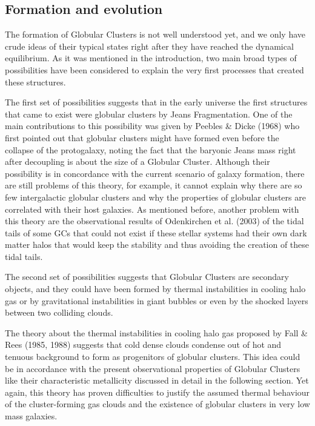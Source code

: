 \subsection{Formation and evolution}

The formation of Globular Clusters is not well understood yet, and we only have crude ideas of their typical states right after they have reached the dynamical equilibrium. As it was mentioned in the introduction, two main broad types of possibilities have been considered to explain the very first processes that created these structures. 

The first set of possibilities suggests that in the early universe the first structures that came to exist were globular clusters by Jeans Fragmentation. One of the main contributions to this possibility was given by Peebles \& Dicke (1968) \cite{7} who first pointed out that globular clusters might have formed even before the collapse of the protogalaxy, noting the fact that the baryonic Jeans mass right after decoupling is about the size of a Globular Cluster. Although their possibility is in concordance with the current scenario of galaxy formation, there are still problems of this theory, for example, it cannot explain why there are so few intergalactic globular clusters and why the properties of globular clusters are correlated with their host galaxies. As mentioned before, another problem with this theory are the observational results of Odenkirchen et al. (2003) \cite{12} of the tidal tails of some GCs that could not exist if these stellar systems had their own dark matter halos that would keep the stability and thus avoiding the creation of these tidal tails.

The second set of possibilities suggests that Globular Clusters are secondary objects, and they could have been formed by thermal instabilities in cooling halo gas or by gravitational instabilities in giant bubbles or even by the shocked layers between two colliding clouds. 

The theory about the thermal instabilities in cooling halo gas proposed by Fall \& Rees (1985, 1988)\cite{13}  suggests that cold dense clouds condense out of hot and tenuous background to form as progenitors of globular clusters. This idea could be in accordance with the present observational properties of Globular Clusters like their characteristic metallicity discussed in detail in the following section. Yet again, this theory has proven difficulties to justify the assumed thermal behaviour of the cluster-forming gas clouds and the existence of globular clusters in very low mass galaxies.

